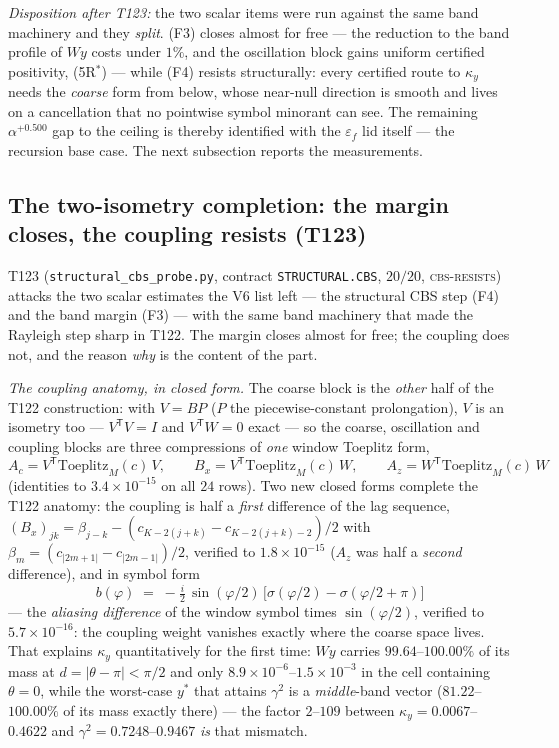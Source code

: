 \documentclass[11pt,a4paper]{article}
\begin{document}
\begin{keybox}
\emph{Disposition after T123:} the two scalar items were run against the same band machinery
and they \emph{split}. (F3) closes almost for free --- the reduction to the band profile of
$Wy$ costs under $1\%$, and the oscillation block gains uniform certified positivity,
(5R$^*$) --- while (F4) resists structurally: every certified route to $\kappa_y$ needs the
\emph{coarse} form from below, whose near-null direction is smooth and lives on a cancellation
that no pointwise symbol minorant can see. The remaining $\alpha^{+0.500}$ gap to the ceiling
is thereby identified with the $\varepsilon_f$ lid itself --- the recursion base case. The
next subsection reports the measurements.
\end{keybox}

\subsection{The two-isometry completion: the margin closes, the coupling resists (T123)}
T123 (\texttt{structural\_cbs\_probe.py}, contract \texttt{STRUCTURAL.CBS}, $20/20$,
\textsc{cbs-resists}) attacks the two scalar estimates the V6 list left --- the structural
CBS step (F4) and the band margin (F3) --- with the same band machinery that made the
Rayleigh step sharp in T122. The margin closes almost for free; the coupling does not, and
the reason \emph{why} is the content of the part.

\emph{The coupling anatomy, in closed form.} The coarse block is the \emph{other} half of the
T122 construction: with $V=BP$ ($P$ the piecewise-constant prolongation), $V$ is an isometry
too --- $V^{\mathsf T}V=I$ and $V^{\mathsf T}W=0$ exact --- so the coarse, oscillation and
coupling blocks are three compressions of \emph{one} window Toeplitz form,
\[
A_c=V^{\mathsf T}\mathrm{Toeplitz}_M(c)\,V,\qquad
B_x=V^{\mathsf T}\mathrm{Toeplitz}_M(c)\,W,\qquad
A_z=W^{\mathsf T}\mathrm{Toeplitz}_M(c)\,W
\]
(identities to $3.4\times10^{-15}$ on all $24$ rows). Two new closed forms complete the T122
anatomy: the coupling is half a \emph{first} difference of the lag sequence,
$(B_x)_{jk}=\beta_{j-k}-(c_{K-2(j+k)}-c_{K-2(j+k)-2})/2$ with
$\beta_m=(c_{|2m+1|}-c_{|2m-1|})/2$, verified to $1.8\times10^{-15}$ ($A_z$ was half a
\emph{second} difference), and in symbol form
\[
b(\varphi)\;=\;-\tfrac{i}{2}\,\sin(\varphi/2)\,
\bigl[\sigma(\varphi/2)-\sigma(\varphi/2+\pi)\bigr]
\]
--- the \emph{aliasing difference} of the window symbol times $\sin(\varphi/2)$, verified to
$5.7\times10^{-16}$: the coupling weight vanishes exactly where the coarse space lives. That
explains $\kappa_y$ quantitatively for the first time: $Wy$ carries $99.64$--$100.00\%$ of
its mass at $d=|\theta-\pi|<\pi/2$ and only $8.9\times10^{-6}$--$1.5\times10^{-3}$ in the
cell containing $\theta=0$, while the worst-case $y^*$ that attains $\gamma^2$ is a
\emph{middle}-band vector ($81.22$--$100.00\%$ of its mass exactly there) --- the factor
$2$--$109$ between $\kappa_y=0.0067$--$0.4622$ and $\gamma^2=0.7248$--$0.9467$ \emph{is}
that mismatch.
\end{document}

